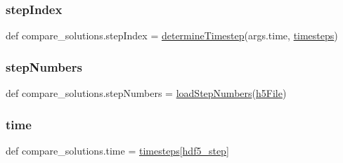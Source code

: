 \mbox{\label{namespacecompare__solutions_ac1e662b0bd5c6fffe31397dd114f1a9a}} 
\subsubsection{\texorpdfstring{step\+Index}{stepIndex}}
{\footnotesize\ttfamily def compare\+\_\+solutions.\+step\+Index = \mbox{\hyperlink{namespacecompare__solutions_a93703a7dfe643e19a4ac6d56ceca5b6e}{determine\+Timestep}}(args.\+time, \mbox{\hyperlink{namespacecompare__solutions_a0c934f0f38e7ab253392939e3068c05e}{timesteps}})}

\mbox{\label{namespacecompare__solutions_a2a151e40a9edaf958d726ac3999ac374}} 
\subsubsection{\texorpdfstring{step\+Numbers}{stepNumbers}}
{\footnotesize\ttfamily def compare\+\_\+solutions.\+step\+Numbers = \mbox{\hyperlink{namespacecompare__solutions_a3e94566cadb571133ea525491b2e573e}{load\+Step\+Numbers}}(\mbox{\hyperlink{namespacecompare__solutions_a9aff00b9f52225aceb635bcc6230e32c}{h5\+File}})}

\mbox{\label{namespacecompare__solutions_a83a9f408c6948f95c816240ca5e5bf65}} 
\subsubsection{\texorpdfstring{time}{time}}
{\footnotesize\ttfamily def compare\+\_\+solutions.\+time = \mbox{\hyperlink{namespacecompare__solutions_a0c934f0f38e7ab253392939e3068c05e}{timesteps}}\mbox{[}\mbox{\hyperlink{namespacecompare__solutions_a61c96294f04326c4cd2cd3edaf20b9dc}{hdf5\+\_\+step}}\mbox{]}}

\mbox{\label{namespacecompare__solutions_a0c934f0f38e7ab253392939e3068c05e}} 
